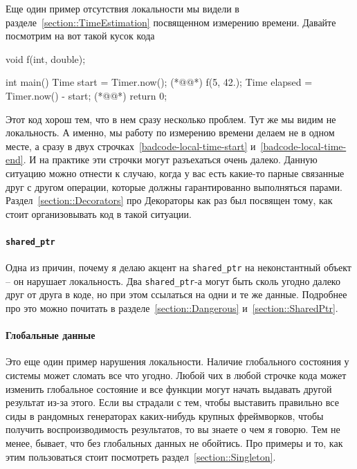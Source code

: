 Еще один пример отсутствия локальности мы видели в разделе~\ref{section::TimeEstimation} посвященном измерению времени.
Давайте посмотрим на вот такой кусок кода
\begin{cppcode}
void f(int, double);

int main() {
  Time start = Timer.now(); (*@@*)
  f(5, 42.);
  Time elapsed = Timer.now() - start; (*@@*)
  return 0;
}
\end{cppcode}
Этот код хорош тем, что в нем сразу несколько проблем.
Тут же мы видим не локальность.
А именно, мы работу по измерению времени делаем не в одном месте, а сразу в двух строчках~\ref{badcode-local-time-start} и~\ref{badcode-local-time-end}.
И на практике эти строчки могут разъехаться очень далеко.
Данную ситуацию можно отнести к случаю, когда у вас есть какие-то парные связанные друг с другом операции, которые должны гарантированно выполняться парами.
Раздел~\ref{section::Decorators} про Декораторы как раз был посвящен тому, как стоит организовывать код в такой ситуации.

\paragraph{\texttt{shared\_ptr}}

Одна из причин, почему я делаю акцент на \texttt{shared\_ptr} на неконстантный объект -- он нарушает локальность.
Два \texttt{shared\_ptr}-а могут быть сколь угодно далеко друг от друга в коде, но при этом ссылаться на одни и те же данные.
Подробнее про это можно почитать в разделе~\ref{section::Dangerous} и~\ref{section::SharedPtr}.

\paragraph{Глобальные данные}

Это еще один пример нарушения локальности.
Наличие глобального состояния у системы может сломать все что угодно.
Любой чих в любой строчке кода может изменить глобальное состояние и все функции могут начать выдавать другой результат из-за этого.
Если вы страдали с тем, чтобы выставить правильно все сиды в рандомных генераторах каких-нибудь крупных фреймворков, чтобы получить воспроизводимость результатов, то вы знаете о чем я говорю.
Тем не менее, бывает, что без глобальных данных не обойтись.
Про примеры и то, как этим пользоваться стоит посмотреть раздел~\ref{section::Singleton}.

